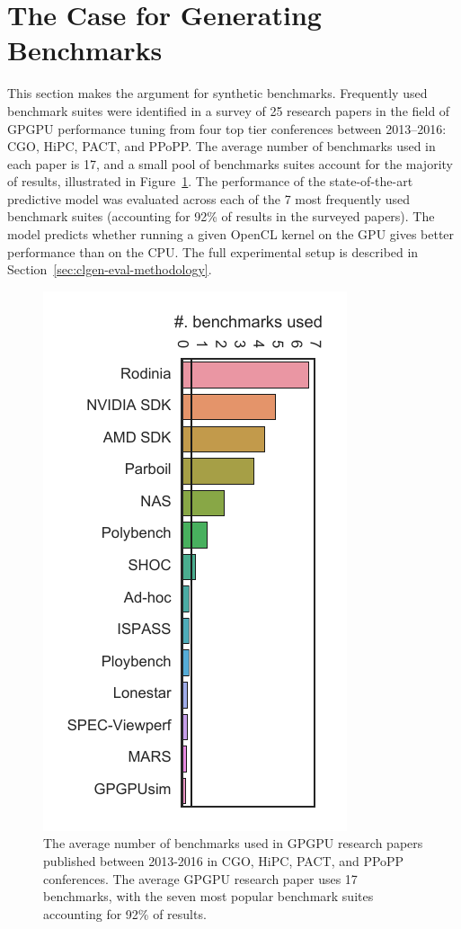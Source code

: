 \section{The Case for Generating Benchmarks}%
\label{sec:the-case-for-benchmark-generators}

This section makes the argument for synthetic benchmarks. Frequently used benchmark suites were identified in a survey of 25 research papers in the field of GPGPU performance tuning from four top tier conferences between 2013--2016: CGO, HiPC, PACT, and PPoPP. The average number of benchmarks used in each paper is 17, and a small pool of benchmarks suites account for the majority of results, illustrated in Figure~\ref{fig:benchmark-suite-distribution}. The performance of the state-of-the-art \citeauthor{Grewe2013}~\cite{Grewe2013} predictive model was evaluated across each of the 7 most frequently used benchmark suites (accounting for 92\% of results in the surveyed papers). The model predicts whether running a given OpenCL kernel on the GPU gives better performance than on the CPU. The full experimental setup is described in Section~\ref{sec:clgen-eval-methodology}.

\begin{figure}
	\centering
	\includegraphics[width=.57\textwidth,angle=90]{img/motivation-c} %
	\caption[Benchmark counts in GPGPU research papers]{%
		The average number of benchmarks used in GPGPU research papers published between 2013-2016 in CGO, HiPC, PACT, and PPoPP conferences. The average GPGPU research paper uses 17 benchmarks, with the seven most popular benchmark suites accounting for 92\% of results.%
	}%
	\label{fig:benchmark-suite-distribution}
\end{figure}

